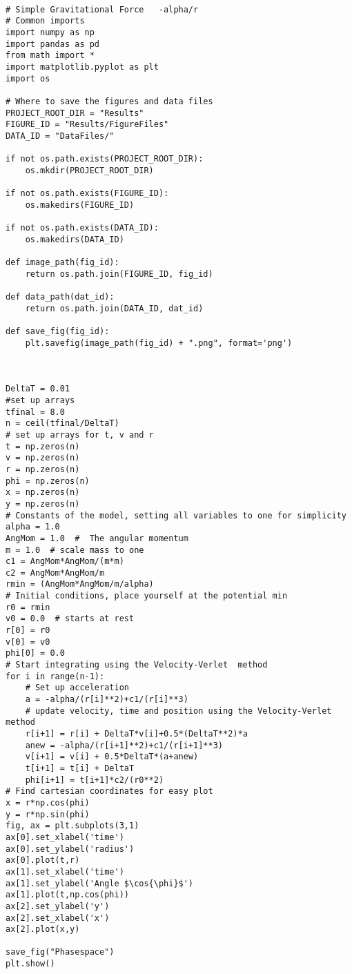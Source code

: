 \documentclass[%
oneside,                 %
final,                   %
10pt]{article}
\begin{document}
\begin{verbatim}

# Simple Gravitational Force   -alpha/r
# Common imports
import numpy as np
import pandas as pd
from math import *
import matplotlib.pyplot as plt
import os

# Where to save the figures and data files
PROJECT_ROOT_DIR = "Results"
FIGURE_ID = "Results/FigureFiles"
DATA_ID = "DataFiles/"

if not os.path.exists(PROJECT_ROOT_DIR):
    os.mkdir(PROJECT_ROOT_DIR)

if not os.path.exists(FIGURE_ID):
    os.makedirs(FIGURE_ID)

if not os.path.exists(DATA_ID):
    os.makedirs(DATA_ID)

def image_path(fig_id):
    return os.path.join(FIGURE_ID, fig_id)

def data_path(dat_id):
    return os.path.join(DATA_ID, dat_id)

def save_fig(fig_id):
    plt.savefig(image_path(fig_id) + ".png", format='png')


    
DeltaT = 0.01
#set up arrays 
tfinal = 8.0
n = ceil(tfinal/DeltaT)
# set up arrays for t, v and r
t = np.zeros(n)
v = np.zeros(n)
r = np.zeros(n)
phi = np.zeros(n)
x = np.zeros(n)
y = np.zeros(n)
# Constants of the model, setting all variables to one for simplicity
alpha = 1.0
AngMom = 1.0  #  The angular momentum
m = 1.0  # scale mass to one
c1 = AngMom*AngMom/(m*m)
c2 = AngMom*AngMom/m
rmin = (AngMom*AngMom/m/alpha)
# Initial conditions, place yourself at the potential min
r0 = rmin
v0 = 0.0  # starts at rest
r[0] = r0
v[0] = v0
phi[0] = 0.0
# Start integrating using the Velocity-Verlet  method
for i in range(n-1):
    # Set up acceleration
    a = -alpha/(r[i]**2)+c1/(r[i]**3)
    # update velocity, time and position using the Velocity-Verlet method
    r[i+1] = r[i] + DeltaT*v[i]+0.5*(DeltaT**2)*a
    anew = -alpha/(r[i+1]**2)+c1/(r[i+1]**3)
    v[i+1] = v[i] + 0.5*DeltaT*(a+anew)
    t[i+1] = t[i] + DeltaT
    phi[i+1] = t[i+1]*c2/(r0**2)
# Find cartesian coordinates for easy plot    
x = r*np.cos(phi)
y = r*np.sin(phi)
fig, ax = plt.subplots(3,1)
ax[0].set_xlabel('time')
ax[0].set_ylabel('radius')
ax[0].plot(t,r)
ax[1].set_xlabel('time')
ax[1].set_ylabel('Angle $\cos{\phi}$')
ax[1].plot(t,np.cos(phi))
ax[2].set_ylabel('y')
ax[2].set_xlabel('x')
ax[2].plot(x,y)

save_fig("Phasespace")
plt.show()


\end{verbatim}
\end{document}
